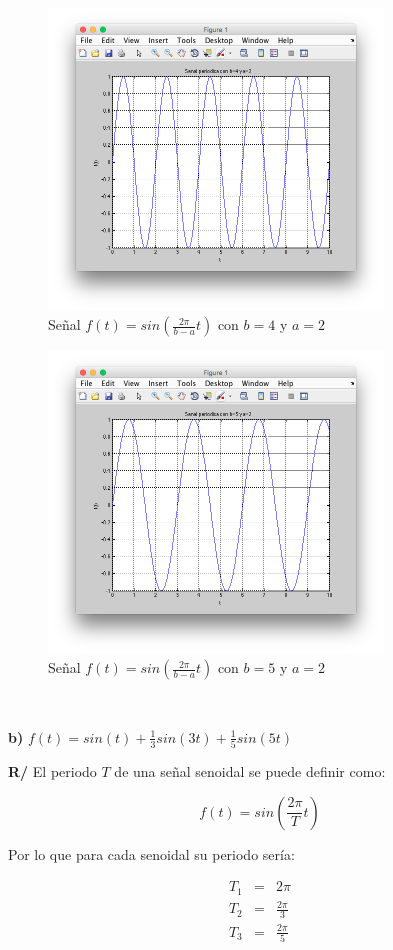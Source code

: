 \documentclass[twocolumn]{article}
\begin{document}
\begin{figure}[!t]
\centering
\includegraphics[width=3.5in]{imgs/ba4_2.png}
\caption{Señal $f(t) = sin(\frac{2\pi}{b-a}t)$ con $b=4$ y $a=2$}
\label{fig_ba4_2}
\end{figure}

\begin{figure}[!t]
\centering
\includegraphics[width=3.5in]{imgs/ba5_2.png}
\caption{Señal $f(t) = sin(\frac{2\pi}{b-a}t)$ con $b=5$ y $a=2$}
\label{fig_ba5_2}
\end{figure}

$\,$

\textbf{b)} $f(t) = sin(t) + \frac{1}{3}sin(3t) + \frac{1}{5}sin(5t)$

\textbf{R/} El periodo $T$ de una señal senoidal se puede definir como:

$$f(t) = sin\left(\frac{2\pi}{T}t\right)$$

Por lo que para cada senoidal su periodo sería:

\begin{eqnarray*}
T_1 &=& 2\pi\\
T_2 &=& \frac{2\pi}{3}\\
T_3 &=& \frac{2\pi}{5}
\end{eqnarray*}
\end{document}
